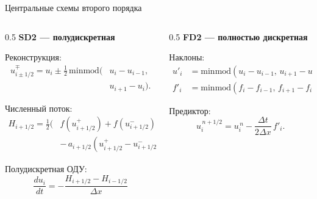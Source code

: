 \documentclass[ignoreonframetext,unicode,aspectratio=169]{beamer}
\begin{document}
	
		\begin{frame}{Центральные схемы второго порядка}
		\begin{columns}[t]
			\begin{column}{0.5\textwidth}
				\centering\textbf{SD2 --- полудискретная}\par
				\vspace{0.1 cm}
				\small
				\begin{block}{Реконструкция:}
					\[
					\begin{aligned}
						u^\mp_{i\pm1/2} = u_i \pm \tfrac12\,\text{minmod}\big(&u_i-u_{i-1},\\[-3pt]
						&u_{i+1}-u_i\big).
					\end{aligned}
					\]
				\end{block}
				\vspace{-0.2 cm}
				\begin{block}{Численный поток:}
					\[
					\begin{aligned}
						H_{i+1/2}=\tfrac12\big(&f(u^+_{i+1/2})+f(u^-_{i+1/2})\\[-3pt]
						&-\,a_{i+1/2}(u^+_{i+1/2}-u^-_{i+1/2})\big).
					\end{aligned}
					\]
				\end{block}
				\vspace{-0.2 cm}
				\begin{block}{Полудискретная ОДУ:}
					\[
					\frac{d u_i}{dt}=-\frac{H_{i+1/2}-H_{i-1/2}}{\Delta x}
					\]
				\end{block}
			\end{column}
			\begin{column}{0.5\textwidth}
				\centering\textbf{FD2 --- полностью дискретная}\par
				\vspace{0.1 cm}
				\small
				\begin{block}{Наклоны:}
					\[
					\begin{aligned}
						u'_i &= \text{minmod}(u_i-u_{i-1},\,u_{i+1}-u_i).\\[-3pt]
						f'_i &= \text{minmod}(f_i-f_{i-1},\,f_{i+1}-f_i).
					\end{aligned}
					\]
				\end{block}
				\vspace{-0.2 cm}
				\begin{block}{Предиктор:}
					\[
					u_i^{\,n+1/2}=u_i^{\,n}-\frac{\Delta t}{2\Delta x}\,f'_i.
\]
\end{block}
\end{column}
\end{columns}
\end{frame}
\end{document}
